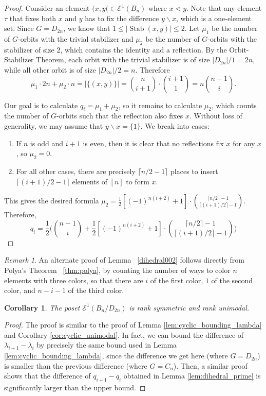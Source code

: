 \documentclass[10 pt]{amsart}
\theoremstyle{plain}
\newtheorem{cor}[thm]{Corollary}
\theoremstyle{definition}
\theoremstyle{remark}
\newtheorem{rem}[thm]{Remark}
\numberwithin{equation}{section}
\newcommand{\minus}{\backslash}
\newcommand{\dstyle}{\displaystyle}
\def\Stab{\operatorname{Stab}}
\begin{document}
\begin{proof}
Consider an element $(x , y( \in \mathcal E^1(B_n)$ where $x \lessdot y$. Note that any element $\tau $ that fixes both $x$ and $y$ has to fix the difference $y\minus x$, which is a one-element set. Since $G = D_{2n}$, 
we know that $1\leq |\Stab (x , y)| \leq 2$.   
Let $\mu_1$ be the number of $G$-orbits with the trivial stabilizer and $\mu_2$ be the number of $G$-orbits with the stabilizer of size $2$, which contains the identity and a reflection. By the Orbit-Stabilizer Theorem, each orbit with the trivial stabilizer is of size $|D_{2n}| /1 = 2n $, while all other orbit is of size $|D_{2n}|/2 = n$.  Therefore $$\mu_1 \cdot 2n + \mu_2 \cdot n = |\{(x, y)\}| = {n \choose {i+1}}  \cdot {{i+1} \choose 1} = n {n-1 \choose i }.$$

Our goal is to calculate $q_i = \mu_1 + \mu_2$, so it remains to calculate $\mu_2$, which counts the number of $G$-orbits such that the reflection also fixes $x$. Without loss of generality, we may assume that $y\minus x = \{1\}$. 
We break into cases:
\begin{enumerate}
\item If $n$ is odd and $i+1$ is even, then it is clear that no reflections fix $x$ for any $x$, so $\mu_2=0$. 
\item For all other cases, there are precisely $\lceil n/2 -1\rceil$ places to insert $\lceil (i+1)/2 - 1 \rceil$ elements of $[n]$ to form $x$. 
\end{enumerate}
This gives the desired formula $\dstyle \mu_2 =  \frac{1}{2} [(-1)^{n(i+2)}+1] \cdot { \lceil n/2\rceil -1  \choose \lceil (i+1)/2 \rceil - 1}   $. Therefore, 
$$q_i = \frac{1}{2} \Big( {n-1 \choose i } + \frac{1}{2} [(-1)^{n(i+2)}+1] \cdot { \lceil n/2\rceil -1  \choose \lceil (i+1)/2 \rceil - 1}    \Big)$$
\end{proof}
\begin{rem}
An alternate proof of Lemma ~\ref{dihedral002} follows directly from Polya's Theorem ~\ref{thm:polya}, by counting the number of ways to color $n$ elements with three colors, so that there are $i$ of the first color, $1$ of the second color, and $n-i-1$ of the third color.
\end{rem}

\begin{cor}{\label{dihedral003}} 
The poset $\mathcal E^1(B_n/D_{2n})$ is rank symmetric and rank unimodal.
\end{cor}

\begin{proof}
The proof is similar to the proof of Lemma \ref{lem:cyclic_bounding_lambda} and Corollary \ref{cor:cyclic_unimodal}. In fact, we can bound the difference of $\lambda_{i+1} - \lambda_i$ by precisely the same bound used in Lemma \ref{lem:cyclic_bounding_lambda}, since the difference we get here (where $G = D_{2n}$) is smaller than the previous difference (where $G= C_n$). Then, a similar proof shows that the difference of $q_{i+1} - q_i$ obtained  in Lemma \ref{lem:dihedral_prime} is significantly larger than the upper bound.
\end{proof}
\end{document}

